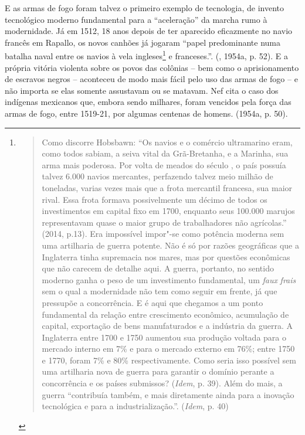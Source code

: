 E as armas de fogo foram talvez o primeiro exemplo de tecnologia, de
invento tecnológico moderno fundamental para a ``aceleração'' da marcha
rumo à modernidade. Já em 1512, 18 anos depois de ter aparecido
eficazmente no navio francês em Rapallo, os novos canhões já jogaram
``papel predominante numa batalha naval entre os navios à vela
ingleses\footnote{\begin{quote}
  Como discorre Hobsbawn: ``Os navios e o comércio ultramarino eram,
  como todos sabiam, a seiva vital da Grã-Bretanha, e a Marinha, sua
  arma mais poderosa. Por volta de meados do século , o país
  possuía talvez 6.000 navios mercantes, perfazendo talvez meio milhão
  de toneladas, varias vezes mais que a frota mercantil francesa, sua
  maior rival. Essa frota formava possivelmente um décimo de todos os
  investimentos em capital fixo em 1700, enquanto seus 100.000 marujos
  representavam quase o maior grupo de trabalhadores não agrícolas.''
  (2014, p.13). Era impossível impor"-se como potência moderna sem uma
  artilharia de guerra potente. Não é só por razões geográficas que a
  Inglaterra tinha supremacia nos mares, mas por questões econômicas que
  não carecem de detalhe aqui. A guerra, portanto, no sentido moderno
  ganha o peso de um investimento fundamental, um \emph{faux}
  \emph{frais} sem o qual a modernidade não tem como seguir em frente,
  já que pressupõe a concorrência. E é aqui que chegamos a um ponto
  fundamental da relação entre crescimento econômico, acumulação de
  capital, exportação de bens manufaturados e a indústria da guerra. A
  Inglaterra entre 1700 e 1750 aumentou sua produção voltada para o
  mercado interno em 7\% e para o mercado externo em 76\%; entre 1750 e
  1770, foram 7\% e 80\% respectivamente. Como seria isso possível sem
  uma artilharia nova de guerra para garantir o domínio perante a
  concorrência e os países submissos? (\emph{Idem}, p. 39). Além do
  mais, a guerra ``contribuía também, e mais diretamente ainda para a
  inovação tecnológica e para a industrialização.''. (\emph{Idem}, p.
  40)
  \end{quote}} e franceses.''. (, 1954a, p. 52). E a própria vitória
violenta sobre os povos das colônias -- bem como o aprisionamento de
escravos negros -- aconteceu de modo mais fácil pelo uso das armas de
fogo -- e não importa se elas somente assustavam ou se matavam. Nef cita
o caso dos indígenas mexicanos que, embora sendo milhares, foram
vencidos pela força das armas de fogo, entre 1519-21, por algumas
centenas de homens. (1954a, p. 50).

